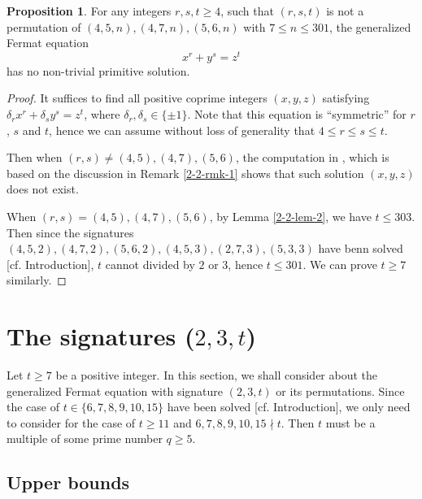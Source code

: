 \documentclass[a4paper, 12pt]{article}
\def\mathbf#1{#1}%
\numberwithin{equation}{section}
\theoremstyle{definition}
\newtheorem{prop}[thm]{Proposition}
\begin{document}
\begin{prop} \label{2-2-prop}
For any integers $r,s,t \ge 4$, such that $(r,s,t)$ is not a permutation of $(4,5,n), (4,7,n), (5,6,n) $ with $7 \le n \le 301$, the generalized Fermat equation
$$ x^r + y^s= z^t $$
has no non-trivial primitive solution.
\end{prop}
\begin{proof}
It suffices to find all positive coprime integers $(x,y,z)$ satisfying  $\delta_r x^r + \delta_s y^s =  z^t$, where $\delta_r,\delta_s \in \{\pm 1\}$. 
Note that this equation is ``symmetric'' for $r$, $s$ and $t$, hence we can assume without loss of generality that $4\le r\le s\le t$.

Then when $(r,s) \neq (4,5), (4,7), (5,6)$, the computation in \cite{Diophantine_after_IUT_I}, which is based on the discussion in Remark \ref{2-2-rmk-1} shows that such solution $(x,y,z)$ does not exist.

When $(r,s) = (4,5), (4,7), (5,6)$, by Lemma \ref{2-2-lem-2}, we have $t \le 303$. Then since the signatures $(4,5,2), (4,7,2), (5,6,2), (4,5,3), (2,7,3), (5,3,3)$ have benn solved [cf. Introduction], $t$ cannot divided by $2$ or $3$, hence $t \le 301$. We can prove $t\ge 7$ similarly.
\end{proof}







\section{The signatures ($\mathbf{2,3,t}$)}
Let $t\ge 7$ be a positive integer. In this section, we shall consider about the generalized Fermat equation with signature $(2,3,t)$ or its permutations. 
Since the case of $t\in \{6,7,8,9,10,15\}$ have been solved [cf. Introduction], we only need to consider for the case of $t\ge 11$ and $6,7,8,9,10,15 \nmid t$. Then $t$ must be a multiple of some prime number $q \ge 5$.

\subsection{Upper bounds}
\end{document}

